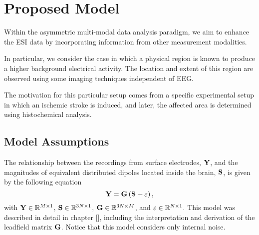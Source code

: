 \chapter{Proposed Model}
%
%
%

Within the asymmetric multi-modal data analysis paradigm, we aim to enhance the ESI data by incorporating information from other measurement modalities.

In particular, we consider the case in which a physical region is known to produce a higher background electrical activity.
%
The location and extent of this region are observed using some imaging techniques independent of EEG.

The motivation for this particular setup comes from a specific experimental setup in which an ischemic stroke is induced, and later, the affected area is determined using histochemical analysis.

\section{Model Assumptions}

The relationship between the recordings from surface electrodes, $\mathbf{Y}$, and the magnitudes of equivalent distributed dipoles located inside the brain, $\mathbf{S}$, is given by the following equation
\begin{equation}
\mathbf{Y} = \mathbf{G} \left( \mathbf{S} + \varepsilon \right),
\label{eq:3.1}
\end{equation}
with $\mathbf{Y} \in \mathbb{R}^{M \times 1}$, $\mathbf{S} \in \mathbb{R}^{3N \times 1}$, $\mathbf{G} \in \mathbb{R}^{3N\times M}$, and $\varepsilon\in \mathbb{R}^{N\times 1}$.
%
This model was described in detail in chapter [], including the interpretation and derivation of the leadfield matrix $\mathbf{G}$.
%
Notice that this model considers only internal noise.

